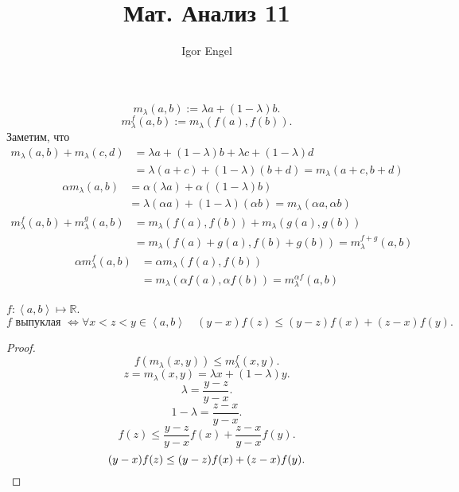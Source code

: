 \documentclass[11pt, oneside]{article}   	%
\title{Мат. Анализ 11}
\author{Igor Engel}
\date{}
\begin{document}
\maketitle
\section{}
\begin{definition}
    
    \[ m_{\lambda}(a,b) := \lambda a + (1-\lambda) b.\]
    \[m_{\lambda}^{f}(a,b) := m_{\lambda}(f(a), f(b)).\]
    Заметим, что 
    \begin{equation*}
        \begin{split}
            m_{\lambda}(a,b) + m_{\lambda}(c,d) 
            &= \lambda a + (1-\lambda)b + \lambda c + (1-\lambda) d\\
            &= \lambda(a+c) + (1-\lambda)(b+d) = m_{\lambda}(a+c, b+d)
        \end{split}
    \end{equation*}
    \begin{equation*}
        \begin{split}
            \alpha m_{\lambda}(a,b)
            &= \alpha(\lambda a) + \alpha((1-\lambda)b)\\
            &= \lambda(\alpha a) + (1-\lambda)(\alpha b) = m_{\lambda}(\alpha a, \alpha b)
        \end{split}
    \end{equation*}
    \begin{equation*}
        \begin{split}
            m_{\lambda}^{f}(a,b) + m_{\lambda}^{g}(a,b)
            &= m_{\lambda}(f(a), f(b)) + m_{\lambda}(g(a), g(b))\\ 
            &= m_{\lambda}(f(a)+g(a), f(b)+g(b)) = m_{\lambda}^{f+g}(a,b) 
        \end{split}
    \end{equation*}
    \begin{equation*}
        \begin{split}
            \alpha m_{\lambda}^{f}(a, b) 
            &= \alpha m_{\lambda}(f(a), f(b))\\
            &= m_{\lambda}(\alpha f(a), \alpha f(b)) = m_{\lambda}^{\alpha f}(a, b)
        \end{split}
    \end{equation*}
\end{definition}
\begin{theorem}
    $f : \left<a, b\right> \mapsto \mathbb{R}$.
    \[ f \text{ выпуклая } \iff \forall{x < z < y\in \left<a, b\right>}\quad (y-x)f(z) \le (y-z)f(x)+(z-x)f(y)   .\] 
    \begin{proof}
        \[ f(m_{\lambda}(x, y)) \le  m_{\lambda}^{f}(x, y) .\]
        \[ z = m_{\lambda}(x,y) = \lambda x + (1-\lambda)y  .\]
        \[ \lambda = \frac{y-z}{y-x} .\]
        \[ 1-\lambda = \frac{z-x}{y-x} .\]
        \[ f(z) \le \frac{y-z}{y-x}f(x) + \frac{z-x}{y-x}f(y) .\]
        \[ (y-x)f(z) \le (y-z)f(x) + (z-x)f(y) .\qedhere\]
    \end{proof}
\end{theorem}
\end{document}

